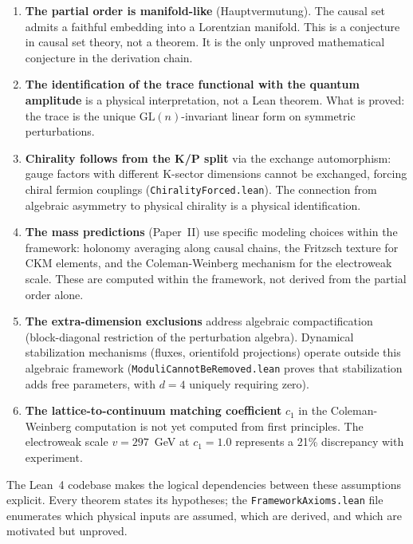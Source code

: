 \documentclass[11pt,letterpaper]{article}
\begin{document}
\begin{enumerate}[label=(\roman*)]
  \item \textbf{The partial order is manifold-like}
    (Hauptvermutung).  The causal set admits a faithful embedding
    into a Lorentzian manifold.  This is a conjecture in causal
    set theory, not a theorem.  It is the only unproved mathematical
    conjecture in the derivation chain.

  \item \textbf{The identification of the trace functional with the
    quantum amplitude} is a physical interpretation, not a Lean
    theorem.  What is proved: the trace is the unique
    $\mathrm{GL}(n)$-invariant linear form on symmetric
    perturbations.

  \item \textbf{Chirality follows from the K/P split} via the
    exchange automorphism: gauge factors with different K-sector
    dimensions cannot be exchanged, forcing chiral fermion
    couplings (\texttt{ChiralityForced.lean}).  The connection
    from algebraic asymmetry to physical chirality is a
    physical identification.

  \item \textbf{The mass predictions} (Paper~II) use specific
    modeling choices within the framework: holonomy averaging
    along causal chains, the Fritzsch texture for CKM elements,
    and the Coleman-Weinberg mechanism for the electroweak scale.
    These are computed within the framework, not derived from
    the partial order alone.

  \item \textbf{The extra-dimension exclusions} address algebraic
    compactification (block-diagonal restriction of the
    perturbation algebra).  Dynamical stabilization mechanisms
    (fluxes, orientifold projections) operate outside this
    algebraic framework (\texttt{ModuliCannotBeRemoved.lean}
    proves that stabilization adds free parameters, with $d = 4$
    uniquely requiring zero).

  \item \textbf{The lattice-to-continuum matching coefficient}
    $c_1$ in the Coleman-Weinberg computation is not yet computed
    from first principles.  The electroweak scale $v = 297$~GeV
    at $c_1 = 1.0$ represents a 21\% discrepancy with experiment.
\end{enumerate}

\noindent The Lean~4 codebase makes the logical dependencies
between these assumptions explicit.  Every theorem states its
hypotheses; the \texttt{FrameworkAxioms.lean} file enumerates
which physical inputs are assumed, which are derived, and which
are motivated but unproved.
\end{document}
